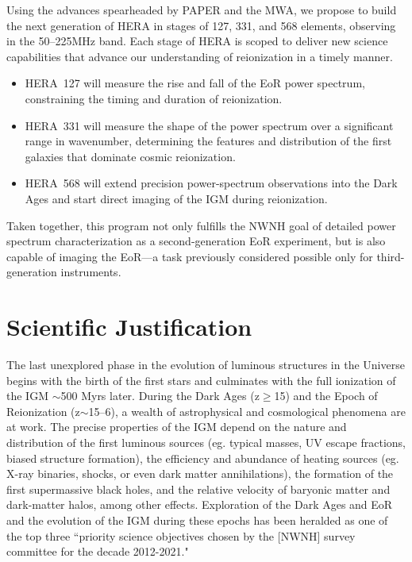 \documentclass[preprint]{aastex}
\begin{document}
Using the advances spearheaded by
PAPER and the MWA,
we propose to build the next generation of HERA in stages of 127, 331, and 568 elements,
observing in the 50--225MHz band.
Each stage of HERA is scoped to deliver new science capabilities that advance our
understanding of reionization in a timely manner.
\begin{itemize}\setlength{\parskip}{0pt}\itemsep0pt
\item HERA~127 will measure the rise and fall of the EoR power
spectrum, constraining the timing and duration of reionization.
\item HERA~331 will measure the shape of the power spectrum over
a significant range in wavenumber, determining the features and distribution of
the first galaxies that dominate cosmic reionization.
\item HERA~568 will extend precision power-spectrum observations
into the Dark Ages and start direct imaging of the IGM during reionization.
\end{itemize}
{ \setlength{\parindent}{0cm}
Taken together, this program
not only fulfills the NWNH goal of detailed power spectrum
characterization as a second-generation EoR experiment, but is also
capable of imaging the EoR---a task previously considered possible only for
third-generation instruments.}

\vspace{-0.25in}
\section{Scientific Justification}
\label{SJsec}

The last unexplored phase in the evolution of luminous structures in the
Universe begins with the birth of the first stars and culminates with the full
ionization of the IGM $\sim$500 Myrs later.  During the Dark Ages
(z$\ge$15) and the Epoch of Reionization (z$\sim$15--6), a wealth of
astrophysical and cosmological phenomena are at work.  The precise properties
of the IGM depend on the nature and distribution of the first luminous sources
(eg. typical masses, UV escape fractions, biased structure formation), the
efficiency and abundance of heating sources (eg.  X-ray binaries, shocks, or
even dark matter annihilations), the formation of the first supermassive black
holes, and the relative velocity of baryonic matter and dark-matter halos,
among other effects.  Exploration of the Dark Ages and EoR and the evolution of
the IGM during these epochs has been heralded as one of the top three
``priority science objectives chosen by the [NWNH] survey committee for the
decade 2012-2021."
\end{document}
